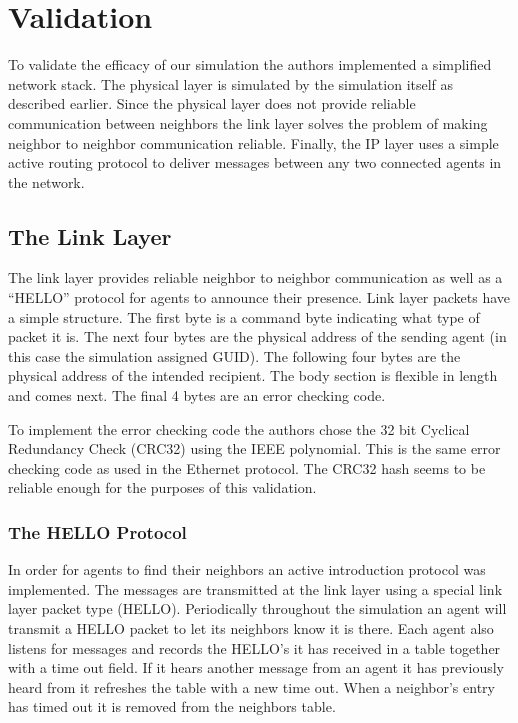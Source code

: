 \section{Validation}

To validate the efficacy of our simulation the authors implemented a simplified network stack. The
physical layer is simulated by the simulation itself as described earlier. Since the physical layer
does not provide reliable communication between neighbors the link layer solves the problem of
making neighbor to neighbor communication reliable. Finally, the IP layer uses a simple active
routing protocol to deliver messages between any two connected agents in the network.

\subsection{The Link Layer}

The link layer provides reliable neighbor to neighbor communication as well as a ``HELLO'' protocol
for agents to announce their presence. Link layer packets have a simple structure. The first byte is
a command byte indicating what type of packet it is. The next four bytes are the physical address of
the sending agent (in this case the simulation assigned GUID). The following four bytes are the
physical address of the intended recipient. The body section is flexible in length and comes next.
The final 4 bytes are an error checking code.

To implement the error checking code the authors chose the 32 bit Cyclical Redundancy Check (CRC32)
using the IEEE polynomial. This is the same error checking code as used in the Ethernet protocol.
The CRC32 hash seems to be reliable enough for the purposes of this validation. 

\subsubsection{The HELLO Protocol}

In order for agents to find their neighbors an active introduction protocol was implemented. The
messages are transmitted at the link layer using a special link layer packet type (HELLO).
Periodically throughout the simulation an agent will transmit a HELLO packet to let its neighbors
know it is there. Each agent also listens for messages and records the HELLO's it has received in a
table together with a time out field. If it hears another message from an agent it has previously
heard from it refreshes the table with a new time out. When a neighbor's entry has timed out it is
removed from the neighbors table.

